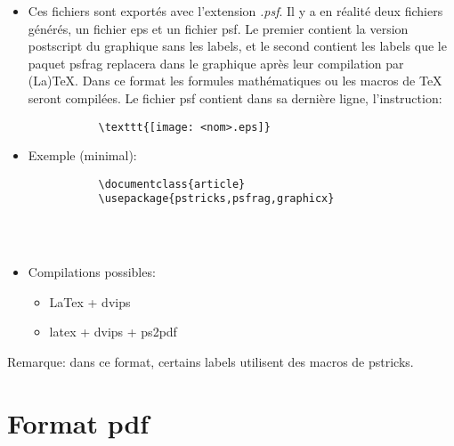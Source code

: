 \begin{itemize}

\item Ces fichiers sont exportés avec l'extension \textit{.psf}. Il y a en réalité deux fichiers générés, un fichier eps et un fichier psf. Le premier contient la version postscript du graphique sans les labels, et le second contient les labels que le paquet psfrag replacera dans le graphique après leur compilation par (La)TeX. Dans ce format les formules mathématiques ou les macros de TeX seront compilées. Le fichier psf contient dans sa dernière ligne, l'instruction: 

\begin{verbatim}
           \texttt{[image: <nom>.eps]}
\end{verbatim}

\item Exemple (minimal):

\begin{verbatim}
           \documentclass{article}
           \usepackage{pstricks,psfrag,graphicx}
            
             
           
\end{verbatim}
\item Compilations possibles:
\begin{itemize}
\item LaTex + dvips
\item latex + dvips + ps2pdf
\end{itemize}
\end{itemize}

Remarque: dans ce format, certains labels utilisent des macros de pstricks.

\section{Format pdf}

